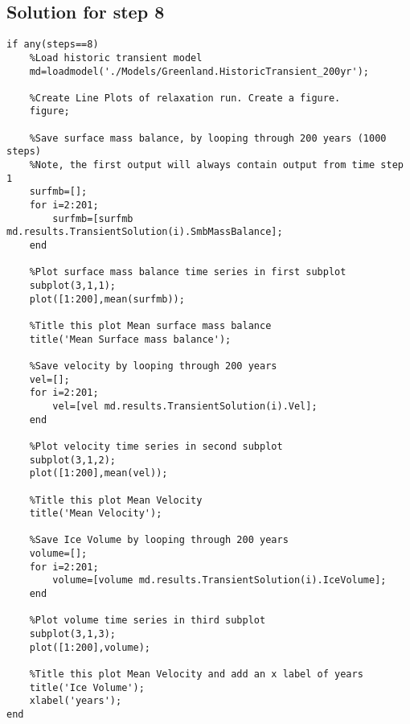 \subsection{Solution for step 8} %
\begin{verbatim}if any(steps==8)
	%Load historic transient model
	md=loadmodel('./Models/Greenland.HistoricTransient_200yr');

	%Create Line Plots of relaxation run. Create a figure.
	figure;

	%Save surface mass balance, by looping through 200 years (1000 steps)
	%Note, the first output will always contain output from time step 1
	surfmb=[];
	for i=2:201;
		surfmb=[surfmb md.results.TransientSolution(i).SmbMassBalance];
	end

	%Plot surface mass balance time series in first subplot
	subplot(3,1,1);
	plot([1:200],mean(surfmb));

	%Title this plot Mean surface mass balance
	title('Mean Surface mass balance');

	%Save velocity by looping through 200 years
	vel=[];
	for i=2:201;
		vel=[vel md.results.TransientSolution(i).Vel];
	end

	%Plot velocity time series in second subplot
	subplot(3,1,2);
	plot([1:200],mean(vel));

	%Title this plot Mean Velocity
	title('Mean Velocity');

	%Save Ice Volume by looping through 200 years
	volume=[];
	for i=2:201;
		volume=[volume md.results.TransientSolution(i).IceVolume];
	end

	%Plot volume time series in third subplot
	subplot(3,1,3);
	plot([1:200],volume);

	%Title this plot Mean Velocity and add an x label of years
	title('Ice Volume');
	xlabel('years');
end\end{verbatim}

